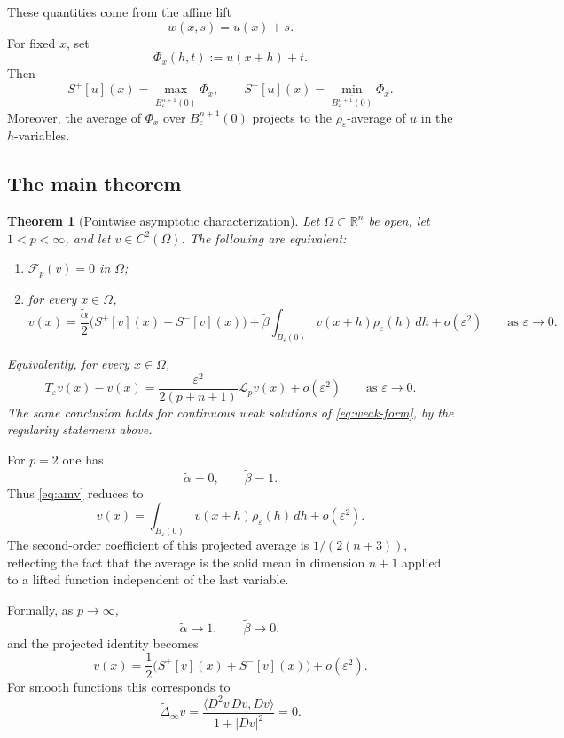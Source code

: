 \documentclass[12pt,reqno]{amsart}
\numberwithin{equation}{section}
\theoremstyle{plain}
\newtheorem{theorem}{Theorem}[section]
\theoremstyle{definition}
\theoremstyle{remark}
\newcommand{\R}{\mathbb{R}}
\newcommand{\talpha}{\widetilde\alpha}
\newcommand{\tbeta}{\widetilde\beta}
\newcommand{\Sp}{S^+}
\newcommand{\Sm}{S^-}
\newcommand{\rhoeps}{\rho_\varepsilon}
\newcommand{\DeltaiR}{\widetilde\Delta_\infty}
\newcommand{\Reg}{\mathcal{F}}
\newcommand{\Lp}{\mathcal L_p}
\begin{document}
These quantities come from the affine lift
\[
  w(x,s)=u(x)+s.
\]
For fixed $x$, set
\[
  \Phi_x(h,t):=u(x+h)+t.
\]
Then
\[
  \Sp[u](x)
  =
  \max_{\overline{B_\varepsilon^{n+1}(0)}}\Phi_x,
  \qquad
  \Sm[u](x)
  =
  \min_{\overline{B_\varepsilon^{n+1}(0)}}\Phi_x.
\]
Moreover, the average of $\Phi_x$ over $B_\varepsilon^{n+1}(0)$ projects
to the $\rhoeps$-average of $u$ in the $h$-variables.

\subsection{The main theorem}
\label{subsec:main-theorem}

\begin{theorem}[Pointwise asymptotic characterization]
\label{thm:main}
Let $\Omega\subset\R^n$ be open, let $1<p<\infty$, and let
$v\in C^2(\Omega)$. The following are equivalent:
\begin{enumerate}[label=\textup{(\roman*)}]
\item $\Reg_p(v)=0$ in $\Omega$;
\item for every $x\in\Omega$,
\begin{equation}\label{eq:amv}
  v(x)
  =
  \frac{\talpha}{2}
  \bigl(\Sp[v](x)+\Sm[v](x)\bigr)
  +
  \tbeta
  \int_{B_\varepsilon(0)}
  v(x+h)\rhoeps(h)\,dh
  +
  o(\varepsilon^2)
  \qquad\text{as }\varepsilon\to0.
\end{equation}
\end{enumerate}
Equivalently, for every $x\in\Omega$,
\begin{equation}\label{eq:main-consistency}
  T_\varepsilon v(x)-v(x)
  =
  \frac{\varepsilon^2}{2(p+n+1)}
  \Lp v(x)
  +
  o(\varepsilon^2)
  \qquad\text{as }\varepsilon\to0.
\end{equation}
The same conclusion holds for continuous weak solutions of
\eqref{eq:weak-form}, by the regularity statement above.
\end{theorem}

For $p=2$ one has
\[
  \talpha=0,
  \qquad
  \tbeta=1.
\]
Thus \eqref{eq:amv} reduces to
\[
  v(x)
  =
  \int_{B_\varepsilon(0)}
  v(x+h)\rhoeps(h)\,dh
  +
  o(\varepsilon^2).
\]
The second-order coefficient of this projected average is
$1/(2(n+3))$, reflecting the fact that the average is the solid mean in
dimension $n+1$ applied to a lifted function independent of the last
variable.

Formally, as $p\to\infty$,
\[
  \talpha\to1,
  \qquad
  \tbeta\to0,
\]
and the projected identity becomes
\begin{equation}\label{eq:pinf-charact}
  v(x)
  =
  \frac12
  \bigl(\Sp[v](x)+\Sm[v](x)\bigr)
  +
  o(\varepsilon^2).
\end{equation}
For smooth functions this corresponds to
\[
  \DeltaiR v
  =
  \frac{\langle D^2v\,Dv,Dv\rangle}{1+|Dv|^2}
  =
  0.
\]
\end{document}
